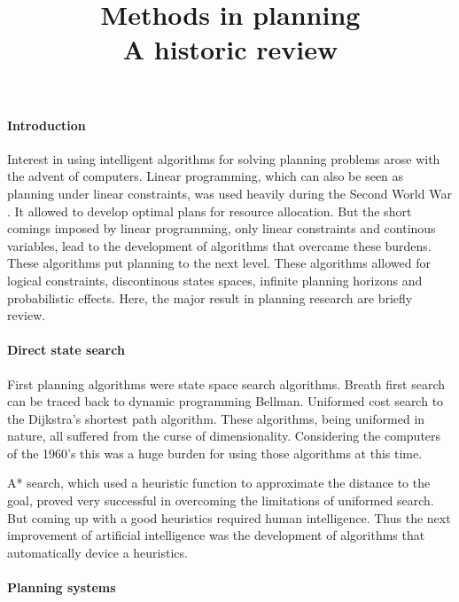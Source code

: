 \documentclass{article}
\begin{document}
\title{Methods in planning  \\ A historic review}

\maketitle

\paragraph*{Introduction}

Interest in using intelligent algorithms for solving planning problems arose
with the advent of computers. Linear programming, which can also be seen as
planning under linear constraints, was used heavily during the Second World War
\cite{linear_prog}. It allowed to develop optimal plans for resource allocation.
But the short comings imposed by linear programming, only linear
constraints and continous variables, lead to the development of
algorithms that overcame these burdens. These algorithms put planning to the
next level. These algorithms allowed for logical constraints,
discontinous states spaces, infinite planning horizons and probabilistic
effects. Here, the major result in planning research are briefly review.

\paragraph*{Direct state search}

First planning algorithms were state space search algorithms. Breath first
search can be traced back to dynamic programming {Bellman}. Uniformed cost
search to the Dijkstra's shortest path algorithm. These algorithms, being
uniformed in nature, all suffered from the curse of dimensionality. Considering
the computers of the 1960's this was a huge burden for using those algorithms
at this time.

A* search, which used a heuristic function to approximate the distance to the
goal, proved very successful in overcoming the limitations of uniformed search.
But coming up with a good heuristics required human intelligence.
Thus the next improvement of artificial intelligence was the development of
algorithms that automatically device a heuristics.

\paragraph*{Planning systems}
\end{document}
